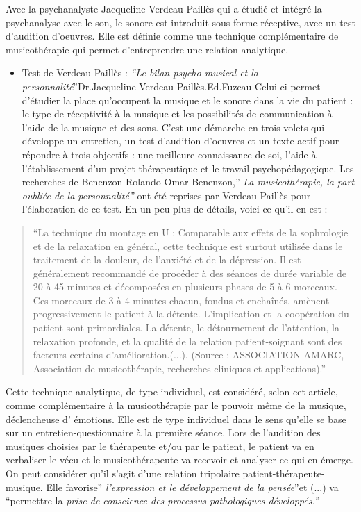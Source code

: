 \documentclass[12pt,french]{report}
\makeatletter
\let\SF@@footnote\footnote
\def\footnote{\ifx\protect\@typeset@protect
    \expandafter\SF@@footnote
  \else
    \expandafter\SF@gobble@opt
  \fi
}
\edef\SF@gobble@opt{\noexpand\protect
  \expandafter\noexpand\csname SF@gobble@opt \endcsname}
\makeatother
\begin{document}
Avec la psychanalyste Jacqueline Verdeau-Paillès qui a étudié et intégré
la psychanalyse avec le son, le sonore est introduit sous forme réceptive,
avec un test d'audition d'oeuvres. Elle est définie comme une technique
complémentaire de musicothérapie qui permet d\textquoteright entreprendre
une relation analytique. 
\begin{itemize}
\item Test de Verdeau-Paillès :\footnote{\emph{``Le bilan psycho-musical et la personnalité}''Dr.Jacqueline
Verdeau-Paillès.Ed.Fuzeau} Celui-ci permet d'étudier la place qu'occupent la musique et le sonore
dans la vie du patient : le type de réceptivité à la musique et les
possibilités de communication à l'aide de la musique et des sons.
C'est une démarche en trois volets qui développe un entretien, un
test d'audition d'oeuvres et un texte actif pour répondre à trois
objectifs : une meilleure connaissance de soi, l'aide à l'établissement
d'un projet thérapeutique et le travail psychopédagogique. Les recherches
de Benenzon\footnote{Rolando Omar Benenzon,'' \emph{La musicothérapie, la part oubliée
de la personnalité''}} ont été reprises par Verdeau-Paillès pour l'élaboration de ce test.
En un peu plus de détails, voici ce qu'il en est :
\end{itemize}
\begin{quote}
``La technique du montage en U : Comparable aux effets de la sophrologie
et de la relaxation en général, cette technique est surtout utilisée
dans le traitement de la douleur, de l\textquoteright anxiété et de
la dépression. Il est généralement recommandé de procéder à des séances
de durée variable de 20 à 45 minutes et décomposées en plusieurs phases
de 5 à 6 morceaux. Ces morceaux de 3 à 4 minutes chacun, fondus et
enchaînés, amènent progressivement le patient à la détente. L\textquoteright implication
et la coopération du patient sont primordiales. La détente, le détournement
de l\textquoteright attention, la relaxation profonde, et la qualité
de la relation patient-soignant sont des facteurs certains d\textquoteright amélioration.(...).\footnote{(Source : ASSOCIATION AMARC, Association de musicothérapie, recherches
cliniques et applications).}''
\end{quote}
Cette technique analytique, de type individuel, est considéré, selon
cet article, comme complémentaire à la musicothérapie par le pouvoir
même de la musique, déclencheuse d' émotions. Elle est de type individuel
dans le sens qu'elle se base sur un entretien-questionnaire à la première
séance. Lors de l'audition des musiques choisies par le thérapeute
et/ou par le patient, le patient va en verbaliser le vécu et le musicothérapeute
va recevoir et analyser ce qui en émerge. On peut considérer qu'il
s'agit d'une relation tripolaire patient-thérapeute-musique. Elle
favorise''\emph{ l\textquoteright expression et le développement
de la pensée}''et (...) va ``permettre la \emph{prise de conscience
des processus pathologiques développés.'' }
\end{document}
